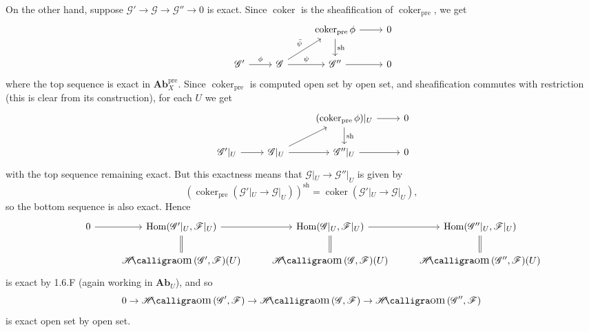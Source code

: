 \documentclass{report}
\newcommand{\cat}[1]{\mathbf{#1}} %
\newcommand{\induced}[1]{\bar{#1}} %
\newcommand{\pre}{{\mathrm{pre}}} %
\newcommand{\sh}{{\mathrm{sh}}} %
\newcommand{\scrF}{\mathscr{F}}
\newcommand{\scrG}{\mathscr{G}}
\DeclareMathOperator{\coker}{coker}
\DeclareMathOperator{\Hom}{Hom}
\DeclareMathOperator{\shHom}{\mathscr{H}\text{\kern -3pt {\calligra\large om}}\,}
\begin{document}
\begin{enumerate}[label=\textbf{2.6.\Alph*.}]
	      On the other hand, suppose $\scrG'\to\scrG\to\scrG''\to0$ is exact. Since
	      $\coker$ is the sheafification of $\coker_\pre$, we get
	      \begin{equation*}
		      \begin{tikzcd}
			      &
			      &
			      &\coker_\pre\phi \arrow{r} \arrow{d}{\sh}
			      &0 \\
			      &\scrG' \arrow{r}{\phi}
			      &\scrG \arrow{r}{\psi} \arrow{ur}{\induced\psi}
			      &\scrG'' \arrow{r}
			      &0
		      \end{tikzcd}
	      \end{equation*}
	      where the top sequence is exact in $\cat{Ab}_X^\pre$. Since
	      $\coker_\pre$ is computed open set by open set, and sheafification
	      commutes with restriction (this is clear from its construction), for
	      each $U$ we get
	      \begin{equation*}
		      \begin{tikzcd}
			      &
			      &
			      &(\coker_\pre\phi)|_U \arrow{r} \arrow{d}{\sh}
			      &0 \\
			      &\scrG'|_U \arrow{r}
			      &\scrG|_U \arrow{r} \arrow{ur}
			      &\scrG''|_U \arrow{r}
			      &0
		      \end{tikzcd}
	      \end{equation*}
	      with the top sequence remaining exact. But this exactness means that
	      $\scrG|_U\to\scrG''|_U$ is given by
	      \begin{equation*}
		      (\coker_\pre(\scrG'|_U\to\scrG|_U))^\sh = \coker(\scrG'|_U\to\scrG|_U),
	      \end{equation*}
	      so the bottom sequence is also exact. Hence
	      \begin{equation*}
		      \begin{tikzcd}
			      &0 \arrow{r}
			      &\Hom(\scrG'|_U,\scrF|_U) \arrow{r}
			      &\Hom(\scrG|_U,\scrF|_U) \arrow{r}
			      &\Hom(\scrG''|_U,\scrF|_U) \\
			      &
			      &\shHom(\scrG',\scrF)(U) \arrow[equal]{u}
			      &\shHom(\scrG,\scrF)(U) \arrow[equal]{u}
			      &\shHom(\scrG'',\scrF)(U) \arrow[equal]{u}
		      \end{tikzcd}
	      \end{equation*}
	      is exact by 1.6.F (again working in $\cat{Ab}_U$), and so
	      \begin{equation*}
		      0 \to \shHom(\scrG',\scrF) \to \shHom(\scrG,\scrF) \to \shHom(\scrG'',\scrF)
	      \end{equation*}
	      is exact open set by open set.


\end{enumerate}
\end{document}

